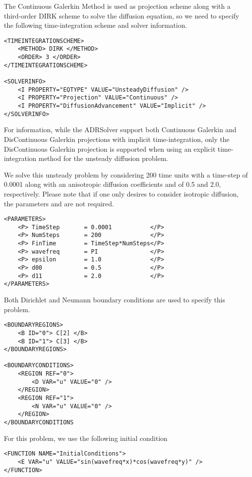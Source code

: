 The Continuous Galerkin Method is used as projection scheme along with a third-order DIRK scheme to 
solve the diffusion equation, so we need to specify the following time-integration scheme and solver information.
\begin{lstlisting}[style=XMLStyle]
<TIMEINTEGRATIONSCHEME>
    <METHOD> DIRK </METHOD>
    <ORDER> 3 </ORDER>
</TIMEINTEGRATIONSCHEME>

<SOLVERINFO>
    <I PROPERTY="EQTYPE" VALUE="UnsteadyDiffusion" />
    <I PROPERTY="Projection" VALUE="Continuous" />
    <I PROPERTY="DiffusionAdvancement" VALUE="Implicit" />
</SOLVERINFO>
\end{lstlisting}
For information, while the ADRSolver support both Continuous Galerkin and DisContinuous Galerkin projections with 
implicit time-integration, only the DisContinuous Galerkin projection is supported when using an explicit time-integration 
method for the unsteady diffusion problem.

We solve this unsteady problem by considering 200 time units with a time-step of 0.0001 along with an anisotropic diffusion 
coefficients  and  of 0.5 and 2.0, respectively. Please note that if one only desires to consider isotropic 
diffusion, the parameters  and  are not required.
\begin{lstlisting}[style=XMLStyle]
<PARAMETERS>
    <P> TimeStep       = 0.0001           </P>
    <P> NumSteps       = 200              </P>
    <P> FinTime        = TimeStep*NumSteps</P>
    <P> wavefreq       = PI               </P>
    <P> epsilon        = 1.0              </P>
    <P> d00            = 0.5              </P>
    <P> d11            = 2.0              </P>
</PARAMETERS>
\end{lstlisting}


Both Dirichlet and Neumann boundary conditions are used to specify this problem.
\begin{lstlisting}[style=XMLStyle]
<BOUNDARYREGIONS>
    <B ID="0"> C[2] </B>
    <B ID="1"> C[3] </B>
</BOUNDARYREGIONS>

<BOUNDARYCONDITIONS>
    <REGION REF="0">
        <D VAR="u" VALUE="0" />
    </REGION>
    <REGION REF="1">
        <N VAR="u" VALUE="0" />
    </REGION>
</BOUNDARYCONDITIONS
\end{lstlisting}

For this problem, we use the following initial condition
\begin{lstlisting}[style=XMLStyle]
<FUNCTION NAME="InitialConditions">
    <E VAR="u" VALUE="sin(wavefreq*x)*cos(wavefreq*y)" />
</FUNCTION>
\end{lstlisting}

